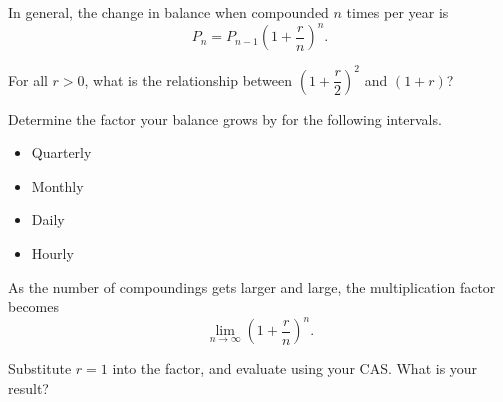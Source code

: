 \documentclass{ximera}
\begin{document}
In general, the change in balance when compounded $n$ times per year is $$P_n = P_{n-1}\left(1+\dfrac{r}{n}\right)^n\text{.}$$

\begin{question}

For all $r > 0$, what is the relationship between $\left(1+\dfrac{r}{2}\right)^2$ and $(1 + r)$?

\begin{multipleChoice}
\end{multipleChoice}

Determine the factor your balance grows by for the following intervals.
\begin{itemize}
\item Quarterly
\begin{multipleChoice}
\end{multipleChoice}
\item Monthly
\begin{multipleChoice}
\end{multipleChoice}
\item Daily
\begin{multipleChoice}
\end{multipleChoice}
\item Hourly
\begin{multipleChoice}
\end{multipleChoice}
\end{itemize}
As the number of compoundings gets larger and large, the multiplication factor becomes $$\lim_{n \to \infty}\left(1 + \dfrac{r}{n}\right)^n \text{.}$$

Substitute $r = 1$ into the factor, and evaluate using your CAS. What is your result?
\begin{onlineOnly}
\begin{sageCell}


\end{sageCell}
\end{onlineOnly}
\end{question}
\end{document}
